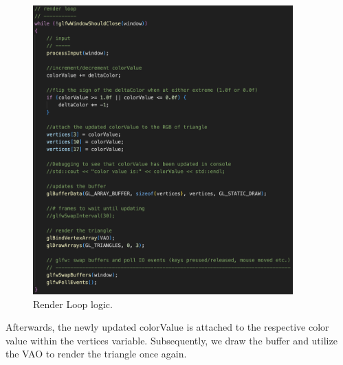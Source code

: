\begin{figure}[htb]
    \centering
    \includegraphics[width=10cm]{./Images/Render_Loop.png}
       \caption{Render Loop logic.}
           \label{Fig:renderloop}
\end{figure}

Afterwards, the newly updated colorValue is attached to the respective color value within the vertices variable.
Subsequently, we draw the buffer and utilize the VAO to render the triangle once again.


